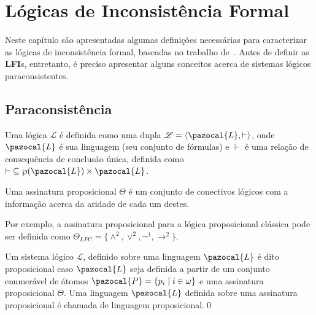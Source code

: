 \chapter{Lógicas de Inconsistência Formal}
\label{cap:LFIs}
Neste capítulo são apresentadas algumas definições necessárias para caracterizar as lógicas de inconsistência formal, baseadas no trabalho de~. Antes de definir as \textbf{LFI}s, entretanto, é preciso apresentar alguns conceitos acerca de sistemas lógicos paraconsistentes.

\section{Paraconsistência}
\label{sec:paracons}
Uma lógica $\mathcal{L}$ é definida como uma dupla $\mathcal{L} = \langle \pazocal{L},\vdash \rangle$, onde $\pazocal{L}$ é sua linguagem (seu conjunto de fórmulas) e $\vdash$ é uma relação de consequência de conclusão única, definida como $\vdash \;\subseteq \wp(\pazocal{L})\times\pazocal{L}$.

\begin{definicao}
    \label{def:ass_prop}
    Uma assinatura proposicional $\Theta$ é um conjunto de conectivos lógicos com a informação acerca da aridade de cada um destes.
\end{definicao}
    Por exemplo, a assinatura proposicional para a lógica proposicional clássica pode ser definida como $\Theta_{LPC} = \{\land^{2}, \lor^{2}, \neg^{1}, \rightarrow^{2}\}$.

\begin{definicao}
    \label{def:proposicional}
    Um sistema lógico $\mathcal{L}$, definido sobre uma linguagem $\pazocal{L}$ é dito proposicional caso $\pazocal{L}$ seja definida a partir de um conjunto enumerável de átomos $\pazocal{P} = \{p_{i} \;| \; i \in \omega \}$ e uma assinatura proposicional $\Theta$. Uma linguagem $\pazocal{L}$ definida sobre uma assinatura proposicional é chamada de linguagem proposicional.\qed{}
\end{definicao}

